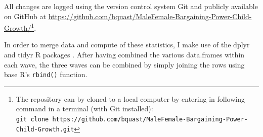 \documentclass[a4paper,british]{article}\usepackage[]{graphicx}\usepackage[]{color}
\newcommand{\code}[1]{\texttt{#1}}
\begin{document}
All changes are logged using the version control system Git \citep{git}
and publicly available on GitHub at \href{https://github.com/bquast/MaleFemale-Bargaining-Power-Child-Growth/}{https://github.com/bquast/MaleFemale-Bargaining-Power-Child-Growth/}\footnote{The repository can by cloned to a local computer by entering in following
command in a terminal (with Git installed):\\
\code{git clone https://github.com/bquast/MaleFemale-Bargaining-Power-Child-Growth.git}}.

In order to merge data and compute of these statistics, I make use
of the dplyr and tidyr R packages \citet{wickham2015dplyr,wickham2016tidyr}.
After having combined the various data.frames within each wave, the
three waves can be combined by simply joining the rows using base
R's \code{rbind()} function\citep{R}.

\end{document}

